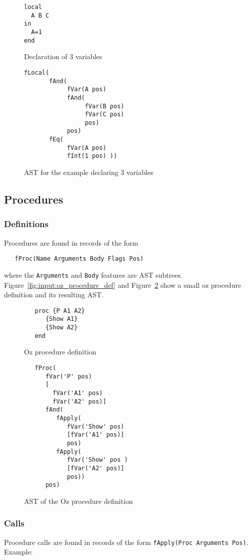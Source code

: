 \documentclass[a4paper]{memoir}
\begin{document}
\begin{figure}
\begin{lstlisting}
local
  A B C
in
  A=1
end
\end{lstlisting}
\caption{Declaration of 3 variables}
\label{fig:input:decls_oz}
\begin{lstlisting}
fLocal(
       fAnd(
            fVar(A pos) 
            fAnd(
                 fVar(B pos) 
                 fVar(C pos) 
                 pos) 
            pos) 
       fEq( 
            fVar(A pos) 
            fInt(1 pos) ))
\end{lstlisting}
\caption{AST for the example declaring 3 variables}
\label{fig:input:decls}
\end{figure}


\subsection{Procedures}\label{sec:input:procedures}
\subsubsection{Definitions}
Procedures are found in records of the form 
\begin{lstlisting}
   fProc(Name Arguments Body Flags Pos) 
\end{lstlisting}
where the \lstinline!Arguments! and \lstinline!Body! features are AST subtrees. 
Figure~\ref{fig:input:oz_procedure_def} and Figure~\ref{fig:input:ast_procedure_def} show a small oz procedure definition and its resulting AST.
\begin{figure}[ht]
\begin{lstlisting}
   proc {P A1 A2}
      {Show A1}
      {Show A2}
   end
\end{lstlisting}
\caption{Oz procedure definition}
\label{fig:input:oz_procedure_def}

\begin{lstlisting}
   fProc(
      fVar('P' pos)
      [
        fVar('A1' pos)
        fVar('A2' pos)]
      fAnd(
         fApply(
            fVar('Show' pos)
            [fVar('A1' pos)]
            pos)
         fApply(
            fVar('Show' pos )
            [fVar('A2' pos)]
            pos))
      pos)
\end{lstlisting}
\caption{AST of the Oz procedure definition}
\label{fig:input:ast_procedure_def}
\end{figure}



\subsubsection{Calls}
Procedure calls are found in records of the form 
\lstinline!fApply(Proc Arguments Pos)!. 
Example:
\end{document}
